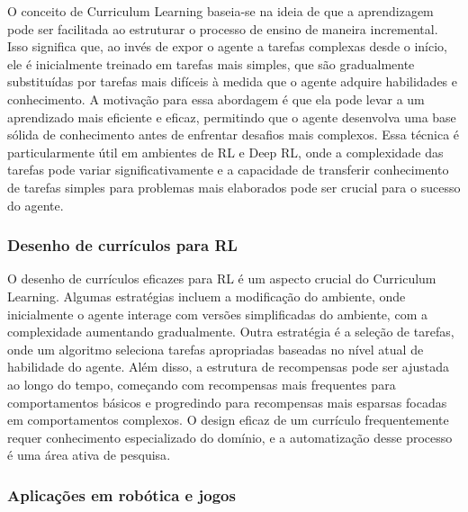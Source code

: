 O conceito de Curriculum Learning baseia-se na ideia de que a aprendizagem pode ser facilitada ao estruturar o processo de ensino de maneira incremental. Isso significa que, ao invés de expor o agente a tarefas complexas desde o início, ele é inicialmente treinado em tarefas mais simples, que são gradualmente substituídas por tarefas mais difíceis à medida que o agente adquire habilidades e conhecimento. A motivação para essa abordagem é que ela pode levar a um aprendizado mais eficiente e eficaz, permitindo que o agente desenvolva uma base sólida de conhecimento antes de enfrentar desafios mais complexos. Essa técnica é particularmente útil em ambientes de RL e Deep RL, onde a complexidade das tarefas pode variar significativamente e a capacidade de transferir conhecimento de tarefas simples para problemas mais elaborados pode ser crucial para o sucesso do agente.

\subsubsection{Desenho de currículos para RL}
\label{subsubsec:curriculum_desenho}

O desenho de currículos eficazes para RL é um aspecto crucial do Curriculum Learning. Algumas estratégias incluem a modificação do ambiente, onde inicialmente o agente interage com versões simplificadas do ambiente, com a complexidade aumentando gradualmente. Outra estratégia é a seleção de tarefas, onde um algoritmo seleciona tarefas apropriadas baseadas no nível atual de habilidade do agente. Além disso, a estrutura de recompensas pode ser ajustada ao longo do tempo, começando com recompensas mais frequentes para comportamentos básicos e progredindo para recompensas mais esparsas focadas em comportamentos complexos. O design eficaz de um currículo frequentemente requer conhecimento especializado do domínio, e a automatização desse processo é uma área ativa de pesquisa\cite{Sukhbaatar2018learninggoalembeddingsselfplay}.

\subsubsection{Aplicações em robótica e jogos}
\label{subsubsec:curriculum_aplicacoes}

